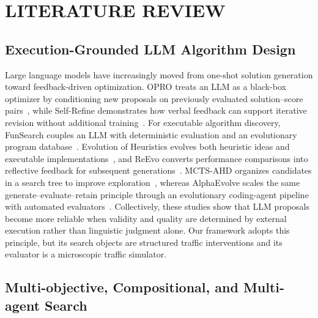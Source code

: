 \section{LITERATURE REVIEW}

\subsection{Execution-Grounded LLM Algorithm Design}

Large language models have increasingly moved from one-shot solution
generation toward feedback-driven optimization. OPRO treats an LLM as a
black-box optimizer by conditioning new proposals on previously evaluated
solution--score pairs~\cite{yang2024opro}, while Self-Refine demonstrates how
verbal feedback can support iterative revision without additional
training~\cite{madaan2023selfrefine}. For executable algorithm discovery,
FunSearch couples an LLM with deterministic evaluation and an evolutionary
program database~\cite{romera2024funsearch}. Evolution of Heuristics evolves
both heuristic ideas and executable implementations~\cite{liu2024eoh}, and
ReEvo converts performance comparisons into reflective feedback for subsequent
generations~\cite{ye2024reevo}. MCTS-AHD organizes candidates in a search tree
to improve exploration~\cite{zheng2025mctsahd}, whereas AlphaEvolve scales the
same generate--evaluate--retain principle through an evolutionary coding-agent
pipeline with automated evaluators~\cite{novikov2025alphaevolve}. Collectively,
these studies show that LLM proposals become more reliable when validity and
quality are determined by external execution rather than linguistic judgment
alone. Our framework adopts this principle, but its search objects are
structured traffic interventions and its evaluator is a microscopic traffic
simulator.

\subsection{Multi-objective, Compositional, and Multi-agent Search}

